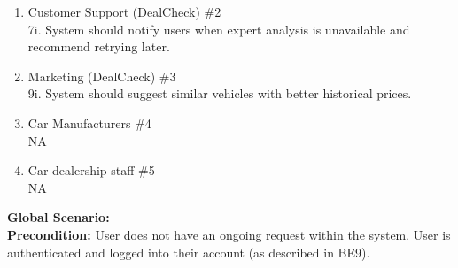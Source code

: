 \documentclass[]{article}
\begin{document}
\begin{enumerate}
\begin{enumerate}[{\bf {BE}1.}]
\begin{enumerate}[{\bf VP1.}]
        {\bf Secondary Scenario} \\
        6i. User does not provide all mandatory fields:
        \begin{enumerate}[{6i}.1]
            \item The system does not allow the user to submit the request until all mandatory fields have been provided.
        \end{enumerate}
    
        6ii. System loses internet connection upon form submission.
        \begin{enumerate}[{6ii}.1]
            \item System is unable to perform the request.
            \item System displays an error message.
        \end{enumerate}
    
        6iii. User provides an insufficient textual description.
        \begin{enumerate}[{6iii}.1]
            \item System does not attempt to analyze the text or generate insights.
            \item System notifies the user that the input is insufficient and prompts for additional details.
        \end{enumerate}
    
        \item Customer Support (DealCheck) \#2 \\
            7i. System should notify users when expert analysis is unavailable and recommend retrying later.
        \item Marketing (DealCheck) \#3 \\
            9i. System should suggest similar vehicles with better historical prices.
        \item Car Manufacturers \#4 \\
            NA
        \item Car dealership staff \#5 \\
            NA
    \end{enumerate}
    {\bf Global Scenario:}\\
    {\bf Precondition:} User does not have an ongoing request within the system. User is authenticated and logged into their account (as described in BE9).
    

\end{enumerate}
\end{enumerate}
\end{document}

